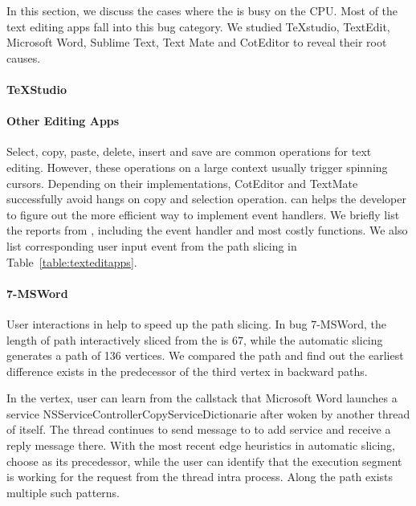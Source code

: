 In this section, we discuss the cases where the \spinningnode is busy on the
CPU. Most of the text editing apps fall into this bug category. We studied
TeXstudio, TextEdit, Microsoft Word, Sublime Text, Text Mate and CotEditor to
reveal their root causes.

\paragraph{TeXStudio}


\paragraph{Other Editing Apps}

Select, copy, paste, delete, insert and save are common operations for text
editing. However, these operations on a large context usually trigger spinning
cursors. Depending on their implementations, CotEditor and TextMate successfully
avoid hangs on copy and selection operation. \xxx can helps the developer to
figure out the more efficient way to implement event handlers. We briefly list
the reports from \spinningnode, including the event handler and most costly
functions. We also list corresponding user input event from the path slicing in
Table~\ref{table:texteditapps}.


\paragraph{7-MSWord}

User interactions in \xxx help to speed up the path slicing.
In bug 7-MSWord, the length of path interactively sliced from the \spinningnode
is 67, while the automatic slicing generates a path of 136 vertices. We
compared the path and find out the earliest difference exists in the
predecessor of the third vertex in backward paths.

In the vertex, user can learn from the callstack that Microsoft Word launches a
service NSServiceControllerCopyServiceDictionarie after woken by another thread
of itself. The thread continues to send message to  to add service
and receive a reply message there. With the most recent edge heuristics in
automatic slicing, \xxx choose  as its precedessor, while the user
can identify that the execution segment is working for the request from the
thread intra process. Along the path exists multiple such patterns.

